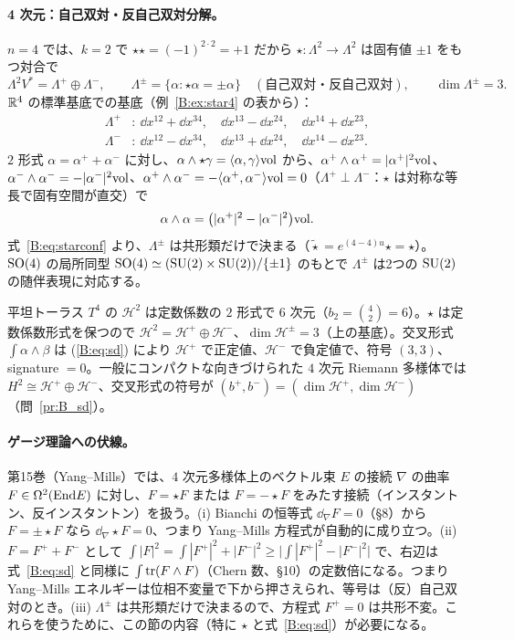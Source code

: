 \paragraph{4 次元：自己双対・反自己双対分解。}$n=4$ では、$k=2$ で $\star\star=(-1)^{2\cdot2}=+1$ だから $\star:\Lambda^2\to\Lambda^2$ は固有値 $\pm1$ をもつ対合で
\[
\Lambda^2V^*=\Lambda^+\oplus\Lambda^-,\qquad\Lambda^\pm=\{\alpha:\star\alpha=\pm\alpha\}\quad(\text{自己双対・反自己双対}),\qquad\dim\Lambda^\pm=3 .
\]
$\mathbb R^4$ の標準基底での基底（例~\ref{B:ex:star4} の表から）：
\begin{align*}
\Lambda^+&:\ \dd x^{12}+\dd x^{34},\quad\dd x^{13}-\dd x^{24},\quad\dd x^{14}+\dd x^{23},\\
\Lambda^-&:\ \dd x^{12}-\dd x^{34},\quad\dd x^{13}+\dd x^{24},\quad\dd x^{14}-\dd x^{23}.
\end{align*}
$2$ 形式 $\alpha=\alpha^++\alpha^-$ に対し、$\alpha\wedge\star\gamma=\langle\alpha,\gamma\rangle\mathrm{vol}$ から、$\alpha^+\wedge\alpha^+=|\alpha^+|^2\mathrm{vol}$、$\alpha^-\wedge\alpha^-=-|\alpha^-|^2\mathrm{vol}$、$\alpha^+\wedge\alpha^-=-\langle\alpha^+,\alpha^-\rangle\mathrm{vol}=0$（$\Lambda^+\perp\Lambda^-$：$\star$ は対称な等長で固有空間が直交）で
\begin{equation}\label{B:eq:sd}
\alpha\wedge\alpha=\bigl(|\alpha^+|^2-|\alpha^-|^2\bigr)\mathrm{vol} .
\end{equation}
式~\eqref{B:eq:starconf} より、$\Lambda^\pm$ は共形類だけで決まる（$\tilde\star=e^{(4-4)u}\star=\star$）。$\mathrm{SO}(4)$ の局所同型 $\mathrm{SO}(4)\simeq(\mathrm{SU}(2)\times\mathrm{SU}(2))/\{\pm1\}$ のもとで $\Lambda^\pm$ は2つの $\mathrm{SU}(2)$ の随伴表現に対応する\tC。

\begin{ex}[$T^4$]\label{B:ex:T4}
平坦トーラス $T^4$ の $\mathcal H^2$ は定数係数の $2$ 形式で $6$ 次元（$b_2=\binom42=6$）。$\star$ は定数係数形式を保つので $\mathcal H^2=\mathcal H^+\oplus\mathcal H^-$、$\dim\mathcal H^\pm=3$（上の基底）。交叉形式 $\int\alpha\wedge\beta$ は (\ref{B:eq:sd}) により $\mathcal H^+$ で正定値、$\mathcal H^-$ で負定値で、符号 $(3,3)$、signature $=0$。一般にコンパクトな向きづけられた $4$ 次元 Riemann 多様体では $H^2\cong\mathcal H^+\oplus\mathcal H^-$、交叉形式の符号が $(b^+,b^-)=(\dim\mathcal H^+,\dim\mathcal H^-)$（問~\ref{pr:B_sd}）。
\end{ex}

\paragraph{ゲージ理論への伏線。}第15巻（Yang--Mills）では、$4$ 次元多様体上のベクトル束 $E$ の接続 $\nabla$ の曲率 $F\in\Omega^2(\mathrm{End} E)$ に対し、$F=\star F$ または $F=-\star F$ をみたす接続（インスタントン、反インスタントン）を扱う。(i) Bianchi の恒等式 $\dd_\nabla F=0$（§8）から $F=\pm\star F$ なら $\dd_\nabla\star F=0$、つまり Yang--Mills 方程式が自動的に成り立つ。(ii) $F=F^++F^-$ として $\int|F|^2=\int|F^+|^2+|F^-|^2\ge\bigl|\int|F^+|^2-|F^-|^2\bigr|$ で、右辺は式~\eqref{B:eq:sd} と同様に $\int\operatorname{tr}(F\wedge F)$（Chern 数、§10）の定数倍になる。つまり Yang--Mills エネルギーは位相不変量で下から押さえられ、等号は（反）自己双対のとき。(iii) $\Lambda^\pm$ は共形類だけで決まるので、方程式 $F^+=0$ は共形不変。これらを使うために、この節の内容（特に $\star$ と式~\eqref{B:eq:sd}）が必要になる。

